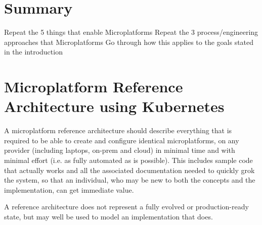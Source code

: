 \documentclass[reprint,amsmath,amssymb,aps]{revtex4-1}
\begin{document}
\section*{\label{sec:summary}Summary}

Repeat the 5 things that enable Microplatforms
Repeat the 3 process/engineering approaches that Microplatforms 
Go through how this applies to the goals stated in the introduction

\newpage
\clearpage
\appendix
\section{\label{sec:architecture}Microplatform Reference Architecture using Kubernetes}

A microplatform reference architecture should describe everything that is required to be able to create and configure identical microplatforms, on any provider (including laptops, on-prem and cloud) in minimal time and with minimal effort (i.e. as fully automated as is possible). This includes sample code that actually works and all the associated documentation needed to quickly grok the system, so that an individual, who may be new to both the concepts and the implementation, can get immediate value.

A reference architecture does not represent a fully evolved or production-ready state, but may well be used to model an implementation that does.



\end{document}
